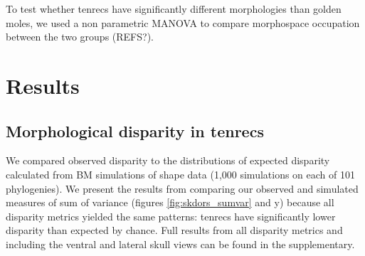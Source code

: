 \documentclass[12pt,a4paper]{article}
\begin{document}
To test whether tenrecs have significantly different morphologies than golden moles, we used a non parametric MANOVA \citep{Anderson2001} to compare morphospace occupation between the two groups (REFS?). 


\section{Results}

\subsection{Morphological disparity in tenrecs} 


We compared observed disparity to the distributions of expected disparity calculated from BM simulations of shape data (1,000 simulations on each of 101 phylogenies). We present the results from comparing our observed and simulated measures of sum of variance (figures \ref{fig:skdors_sumvar} and y) because all disparity metrics yielded the same patterns: tenrecs have significantly lower disparity than expected by chance.  Full results from all disparity metrics and including the ventral and lateral skull views can be found in the supplementary.


\end{document}
